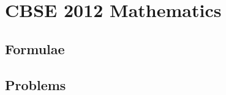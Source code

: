 \documentclass[journal]{IEEEtran}
\begin{document}
\newpage


\tableofcontents

\newpage
\onecolumn


\renewcommand{\thetable}{\theenumi}

\section{CBSE 2012 Mathematics} 
\subsection{Formulae}

\clearpage
\subsection{Problems}

\end{document}
